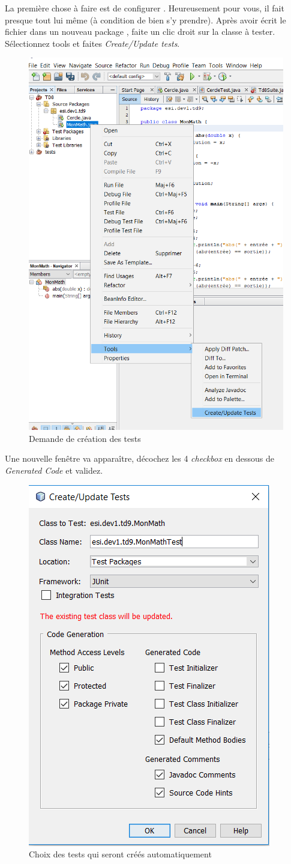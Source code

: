 \documentclass[a4paper,11pt]{style-esi/td}
\begin{document}
La première chose à faire est de configurer .
Heureusement pour vous, il fait presque tout lui même (à condition de bien s’y prendre).
Après avoir écrit le fichier  dans un nouveau package
, faite un clic droit sur la classe à tester.
Sélectionnez tools et faites \textit{Create/Update tests}.

\begin{figure}[hbt!]
	\begin{center}
		\includegraphics[width=.4\textwidth]{images/create_tests}
	\end{center}
	\caption{Demande de création des tests}
\end{figure}

Une nouvelle fenêtre va apparaître, décochez les 4 \textit{checkbox} en
dessous de \textit{Generated Code} et validez.

\begin{figure}[hbt!]
	\begin{center}
		\includegraphics[width=.3\textwidth]{images/config_tests}
	\end{center}
	\caption{Choix des tests qui seront créés automatiquement}
\end{figure}
\end{document}
